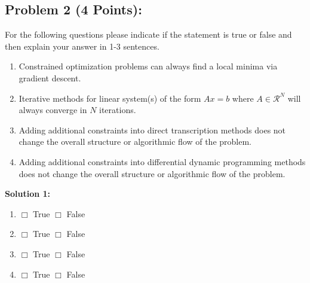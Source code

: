 \documentclass[]{article}
\begin{document}
\clearpage
\subsection*{Problem 2 (4 Points):}
For the following questions please indicate if the statement is true or false and then explain your answer in 1-3 sentences.
\begin{enumerate}[label=(\alph*)]
    \item Constrained optimization problems can always find a local minima via gradient descent.
    \item Iterative methods for linear system(s) of the form $Ax=b$ where $A\in \mathcal{R}^N$ will always converge in $N$ iterations.
    \item Adding additional constraints into direct transcription methods does not change the overall structure or 
    algorithmic flow of the problem.
    \item Adding additional constraints into differential dynamic programming methods does not change the overall structure or algorithmic flow of the problem.
\end{enumerate}

\textbf{Solution 1:}
\begin{enumerate}[label=(\alph*)]
    \item $\Box$ True \quad \quad $\Box$ False \\
    \item $\Box$ True \quad \quad $\Box$ False \\
    \item $\Box$ True \quad \quad $\Box$ False \\
    \item $\Box$ True \quad \quad $\Box$ False \\
    
\end{enumerate}
\end{document}
